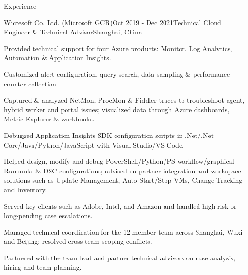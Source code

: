 \documentclass{resume} %
\begin{document}
\begin{rSection}{Experience}
    \begin{rSubsection}{Wicresoft Co. Ltd. (Microsoft GCR)}{Oct 2019 - Dec 2021}{Technical Cloud Engineer \& Technical Advisor}{Shanghai, China}
        \item Provided technical support for four Azure products: Monitor, Log Analytics, Automation \& Application Insights.
        \item Customized alert configuration, query search, data sampling \& performance counter collection.
        \item Captured \& analyzed NetMon, ProcMon \& Fiddler traces to troubleshoot agent, hybrid worker and portal issues; visualized data through Azure dashboards, Metric Explorer \& workbooks.
        \item Debugged Application Insights SDK configuration scripts in .Net/.Net Core/Java/Python/JavaScript with Visual Studio/VS Code.
        \item Helped design, modify and debug PowerShell/Python/PS workflow/graphical Runbooks \& DSC configurations; advised on partner integration and workspace solutions such as Update Management, Auto Start/Stop VMs, Change Tracking and Inventory.
        \item Served key clients such as Adobe, Intel, and Amazon and handled high-risk or long-pending case escalations.
        \item Managed technical coordination for the 12-member team across Shanghai, Wuxi and Beijing; resolved cross-team scoping conflicts.
        \item Partnered with the team lead and partner technical advisors on case analysis, hiring and team planning.
    \end{rSubsection}

\end{rSection}

\end{document}
